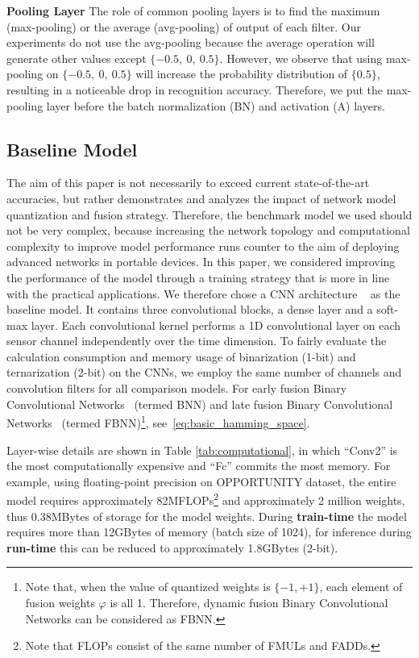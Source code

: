 \documentclass[twoside,twocolumn]{article}
\begin{document}
\noindent\textbf{Pooling Layer} The role of common pooling layers is to find the maximum (max-pooling) or the average (avg-pooling) of output of each filter. Our experiments do not use the avg-pooling because the average operation will generate other values except $\{-0.5,\ 0,\ 0.5\}$. However, we observe that using max-pooling on $\{-0.5,\ 0,\ 0.5\}$ will increase the probability distribution of $\{0.5\}$, resulting in a noticeable drop in recognition accuracy. Therefore, we put the max-pooling layer before the batch normalization (BN) and activation (A) layers.

\subsection{Baseline Model}
The aim of this paper is not necessarily to exceed current state-of-the-art accuracies, but rather demonstrates and analyzes the impact of network model quantization and fusion strategy. Therefore, the benchmark model we used should not be very complex, because increasing the network topology and computational complexity to improve model performance runs counter to the aim of deploying advanced networks in portable devices. In this paper, we considered improving the performance of the model through a training strategy that is more in line with the practical applications. We therefore chose a CNN architecture ~\cite{b44} as the baseline model. It contains three convolutional blocks, a dense layer and a soft-max layer. Each convolutional kernel performs a 1D convolutional layer on each sensor channel independently over the time dimension. To fairly evaluate the calculation consumption and memory usage of binarization (1-bit) and ternarization (2-bit) on the CNNs, we employ the same number of channels and convolution filters for all comparison models. For early fusion Binary Convolutional Networks~\cite{b16} (termed BNN) and late fusion Binary Convolutional Networks~\cite{b16} (termed FBNN)\footnote{Note that, when the value of quantized weights is $\{-1,+1\}$, each element of fusion weights $\varphi$ is all 1. Therefore, dynamic fusion Binary Convolutional Networks can be considered as FBNN.}, see~\eqref{eq:basic_hamming_space}.

Layer-wise details are shown in Table \ref{tab:computational}, in which ``Conv2'' is the most computationally expensive and ``Fc'' commits the most memory. For example, using floating-point precision on OPPORTUNITY dataset, the entire model requires approximately 82MFLOPs\footnote{Note that FLOPs consist of the same number of FMULs and FADDs.} and approximately 2 million weights, thus 0.38MBytes of storage for the model weights. During \textbf{train-time} the model requires more than 12GBytes of memory (batch size of 1024), for inference during \textbf{run-time} this can be reduced to approximately 1.8GBytes (2-bit).
\end{document}
